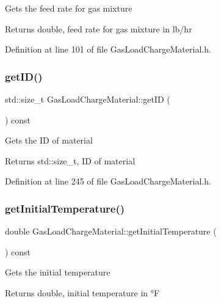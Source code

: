 Gets the feed rate for gas mixture \begin{DoxyReturn}{Returns}
double, feed rate for gas mixture in lb/hr 
\end{DoxyReturn}


Definition at line 101 of file Gas\+Load\+Charge\+Material.\+h.

\mbox{\label{class_gas_load_charge_material_a32dc0d73857ebe4322cf525064713cf6}} 
\subsubsection{\texorpdfstring{get\+I\+D()}{getID()}}
{\footnotesize\ttfamily std\+::size\+\_\+t Gas\+Load\+Charge\+Material\+::get\+ID (\begin{DoxyParamCaption}{ }\end{DoxyParamCaption}) const\hspace{0.3cm}{\ttfamily [inline]}}

Gets the ID of material \begin{DoxyReturn}{Returns}
std\+::size\+\_\+t, ID of material 
\end{DoxyReturn}


Definition at line 245 of file Gas\+Load\+Charge\+Material.\+h.

\mbox{\label{class_gas_load_charge_material_af8a83c3720d108baa196394105822db7}} 
\subsubsection{\texorpdfstring{get\+Initial\+Temperature()}{getInitialTemperature()}}
{\footnotesize\ttfamily double Gas\+Load\+Charge\+Material\+::get\+Initial\+Temperature (\begin{DoxyParamCaption}{ }\end{DoxyParamCaption}) const\hspace{0.3cm}{\ttfamily [inline]}}

Gets the initial temperature \begin{DoxyReturn}{Returns}
double, initial temperature in °F 
\end{DoxyReturn}



